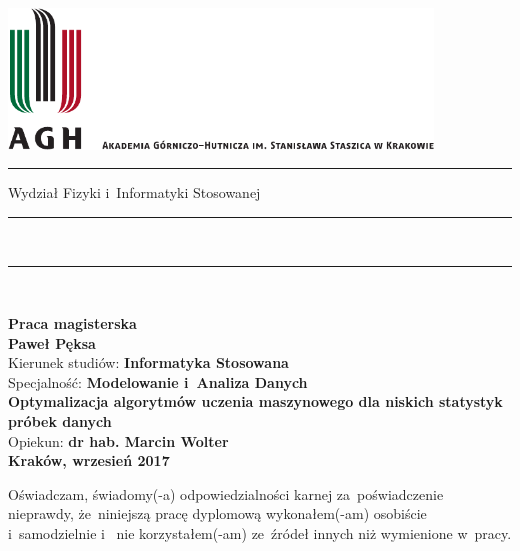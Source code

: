 
\thispagestyle{empty}
\includegraphics[height=37.5mm]{res/agh_logo.pdf}\\
\rule{30mm}{0pt}
{\large \textsf{Wydział Fizyki i~Informatyki Stosowanej}}\\
\rule{\textwidth}{3pt}\\
\rule[2ex]
{\textwidth}{1pt}\\
\vspace{7ex}
\begin{center}
{\LARGE \bf \textsf{Praca magisterska}}\\
\vspace{13ex}
{\bf \Large \textsf{Paweł Pęksa}}\\
\vspace{3ex}
{\sf\small Kierunek studiów:} {\bf\small \textsf{Informatyka Stosowana}}\\
\vspace{1.5ex}
{\sf\small Specjalność:} {\bf\small \textsf{Modelowanie i~Analiza Danych}}\\
\vspace{10ex}
{\bf \huge \textsf{Optymalizacja algorytmów uczenia maszynowego dla niskich statystyk próbek danych}}\\
\vspace{14ex}
{\Large Opiekun: \bf \textsf{dr hab. Marcin Wolter}}\\
\vspace{22ex}
{\large \bf \textsf{Kraków, wrzesień 2017}}
\end{center}

\newpage

{\sf Oświadczam, świadomy(-a) odpowiedzialności karnej za~poświadczenie nieprawdy, że~niniejszą pracę dyplomową wykonałem(-am) osobiście i~samodzielnie i~ nie korzystałem(-am) ze~źródeł innych niż wymienione w~pracy.}

